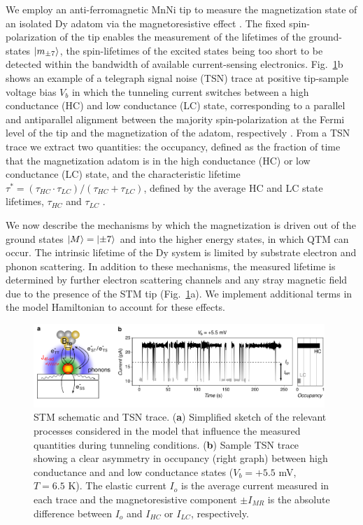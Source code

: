 \documentclass[
reprint,amsmath,amssymb,aps]{revtex4-2}
\begin{document}
We employ an anti-ferromagnetic MnNi tip to measure the magnetization state of an isolated Dy adatom via the magnetoresistive effect \cite{wiesendanger_ObservationVacuumTunneling_1990,Khajetoorians2013,paul_ControlMillisecondSpin_2017,Natterer2017,Natterer2018}. The fixed spin-polarization of the tip enables the measurement of the lifetimes of the ground-states $\ket{m_{\pm7}}$, the spin-lifetimes of the excited states being too short to be detected within the bandwidth of available current-sensing electronics. Fig.~\ref{fig:no_tip_tip_telegraph}b shows an example of a telegraph signal noise (TSN) trace at positive tip-sample voltage bias $V_b$ in which the tunneling current switches between a high conductance (HC) and low conductance (LC) state, corresponding to a parallel and antiparallel alignment between the majority spin-polarization at the Fermi level of the tip and the magnetization of the adatom, respectively \cite{delgado2010,paul_ControlMillisecondSpin_2017}. From a TSN trace we extract two quantities: the occupancy, defined as the fraction of time that the magnetization adatom is in the high conductance (HC) or low conductance (LC) state, and the characteristic lifetime $\tau ^*=(\tau_{HC}  \cdot \tau_{LC})/( \tau_{HC} + \tau_{LC})$, defined by the average HC and LC state lifetimes, $ \tau_{HC}$ and  $\tau_{LC}$ \cite{Khajetoorians2013}. 

We now describe the mechanisms by which the magnetization is driven out of the ground states $\ket{M}=\ket{\pm7}$ and into the higher energy states, in which QTM can occur. The intrinsic lifetime of the Dy system is limited by substrate electron and phonon scattering. In addition to these mechanisms, the measured lifetime is determined by further electron scattering channels and any stray magnetic field due to the presence of the STM tip (Fig.~\ref{fig:no_tip_tip_telegraph}a). We implement additional terms in the model Hamiltonian to account for these effects. 

\begin{figure}[ht!]
\includegraphics[width=0.98\textwidth]{Fig2_new.pdf}
\caption{STM schematic and TSN trace. (\textbf{a}) Simplified sketch of the relevant processes considered in the model that influence the measured quantities during tunneling conditions. (\textbf{b}) Sample TSN trace showing a clear asymmetry in occupancy (right graph) between high conductance and and low conductance states ($V_{b} = +5.5$ mV, $T = 6.5$ K). The elastic current $I_{o}$ is the average current measured in each trace and the magnetoresistive component $\pm I_{MR}$ is the absolute difference between $I_{o}$ and $I_{HC}$ or $I_{LC}$, respectively.
\label{fig:no_tip_tip_telegraph} }
\end{figure}
\end{document}
